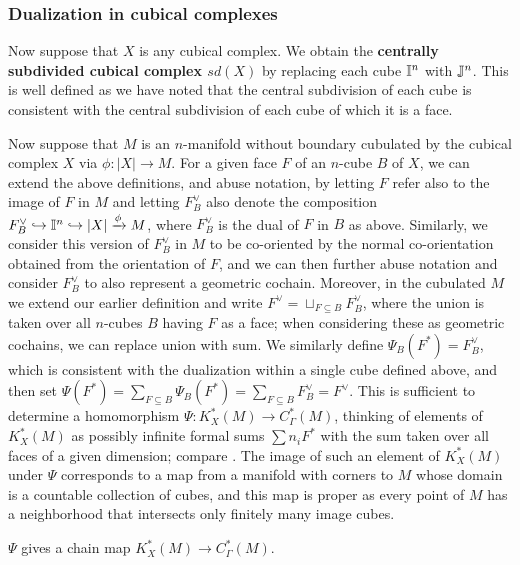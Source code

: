 \subsubsection{Dualization in cubical complexes}\label{S: dualization of complexes}

Now suppose that $X$ is any cubical complex.
We obtain the \textbf{centrally subdivided cubical complex $sd(X)$} by replacing each cube $\mathbb{I}^n$ with $\mathbb{J}^n$.
This is well defined as we have noted that the central subdivision of each cube is consistent with the central subdivision of each cube of which it is a face.

Now suppose that $M$ is an $n$-manifold without boundary cubulated by the cubical complex $X$ via $\phi \colon |X| \to M$.
For a given face $F$ of an $n$-cube $B$ of $X$, we can extend the above definitions, and abuse notation, by letting $F$ refer also to the image of $F$ in $M$ and letting $F_B^\vee$ also denote the composition $F_B^\vee \hookrightarrow \mathbb{I}^n \hookrightarrow |X| \xrightarrow{\phi} M$, where $F_B^\vee$ is the dual of $F$ in $B$ as above.
Similarly, we consider this version of $F_B^\vee$ in $M$ to be co-oriented by the normal co-orientation obtained from the orientation of $F$, and we can then further abuse notation and consider $F_B^\vee$ to also represent a geometric cochain.
Moreover, in the cubulated $M$ we extend our earlier definition and write $F^\vee = \sqcup_{F \subseteq B} F^\vee_B$, where the union is taken over all $n$-cubes $B$ having $F$ as a face; when considering these as geometric cochains, we can replace union with sum.
We similarly define $\Psi_B(F^*) = F_B^\vee$, which is consistent with the dualization within a single cube defined above, and then set $\Psi(F^*) = \sum_{F \subseteq B} \Psi_B(F^*) = \sum_{F \subseteq B} F_{B}^\vee = F^\vee$.
This is sufficient to determine a homomorphism $\Psi \colon K_X^*(M) \to C_\Gamma^*(M)$, thinking of elements of $K_X^*(M)$ as possibly infinite formal sums $\sum n_i F^*$ with the sum taken over all faces of a given dimension; compare \cite[Section 42]{Mun84}. The image of such an element of $K_X^*(M)$ under $\Psi$ corresponds to a map from a manifold with corners to $M$ whose domain is a countable collection of cubes, and this map is proper as every point of $M$ has a neighborhood that intersects only finitely many image cubes.

\begin{lemma}\label{L: dual chain map}
	$\Psi$ gives a chain map $K_X^*(M) \to C_\Gamma^*(M)$.
\end{lemma}

